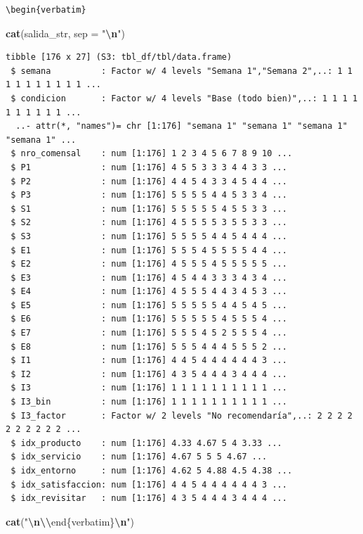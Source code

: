 \documentclass[
  spanish,
]{article}
\newenvironment{Shaded}{\begin{snugshade}}{\end{snugshade}}
\newcommand{\AttributeTok}[1]{\textcolor[rgb]{0.13,0.29,0.53}{#1}}
\newcommand{\FunctionTok}[1]{\textcolor[rgb]{0.13,0.29,0.53}{\textbf{#1}}}
\newcommand{\NormalTok}[1]{#1}
\newcommand{\SpecialCharTok}[1]{\textcolor[rgb]{0.81,0.36,0.00}{\textbf{#1}}}
\newcommand{\StringTok}[1]{\textcolor[rgb]{0.31,0.60,0.02}{#1}}
\begin{document}
\begin{verbatim}
\begin{verbatim}
\end{verbatim}

\begin{Shaded}
\begin{Highlighting}[]
\FunctionTok{cat}\NormalTok{(salida\_str, }\AttributeTok{sep =} \StringTok{"}\SpecialCharTok{\textbackslash{}n}\StringTok{"}\NormalTok{)}
\end{Highlighting}
\end{Shaded}

\begin{verbatim}
tibble [176 x 27] (S3: tbl_df/tbl/data.frame)
 $ semana          : Factor w/ 4 levels "Semana 1","Semana 2",..: 1 1 1 1 1 1 1 1 1 1 ...
 $ condicion       : Factor w/ 4 levels "Base (todo bien)",..: 1 1 1 1 1 1 1 1 1 1 ...
  ..- attr(*, "names")= chr [1:176] "semana 1" "semana 1" "semana 1" "semana 1" ...
 $ nro_comensal    : num [1:176] 1 2 3 4 5 6 7 8 9 10 ...
 $ P1              : num [1:176] 4 5 5 3 3 3 4 4 3 3 ...
 $ P2              : num [1:176] 4 4 5 4 3 3 4 5 4 4 ...
 $ P3              : num [1:176] 5 5 5 5 4 4 5 3 3 4 ...
 $ S1              : num [1:176] 5 5 5 5 5 4 5 5 3 3 ...
 $ S2              : num [1:176] 4 5 5 5 5 3 5 5 3 3 ...
 $ S3              : num [1:176] 5 5 5 5 4 4 5 4 4 4 ...
 $ E1              : num [1:176] 5 5 5 4 5 5 5 5 4 4 ...
 $ E2              : num [1:176] 4 5 5 5 4 5 5 5 5 5 ...
 $ E3              : num [1:176] 4 5 4 4 3 3 3 4 3 4 ...
 $ E4              : num [1:176] 4 5 5 5 4 4 3 4 5 3 ...
 $ E5              : num [1:176] 5 5 5 5 5 4 4 5 4 5 ...
 $ E6              : num [1:176] 5 5 5 5 5 4 5 5 5 4 ...
 $ E7              : num [1:176] 5 5 5 4 5 2 5 5 5 4 ...
 $ E8              : num [1:176] 5 5 5 4 4 4 5 5 5 2 ...
 $ I1              : num [1:176] 4 4 5 4 4 4 4 4 4 3 ...
 $ I2              : num [1:176] 4 3 5 4 4 4 3 4 4 4 ...
 $ I3              : num [1:176] 1 1 1 1 1 1 1 1 1 1 ...
 $ I3_bin          : num [1:176] 1 1 1 1 1 1 1 1 1 1 ...
 $ I3_factor       : Factor w/ 2 levels "No recomendaría",..: 2 2 2 2 2 2 2 2 2 2 ...
 $ idx_producto    : num [1:176] 4.33 4.67 5 4 3.33 ...
 $ idx_servicio    : num [1:176] 4.67 5 5 5 4.67 ...
 $ idx_entorno     : num [1:176] 4.62 5 4.88 4.5 4.38 ...
 $ idx_satisfaccion: num [1:176] 4 4 5 4 4 4 4 4 4 3 ...
 $ idx_revisitar   : num [1:176] 4 3 5 4 4 4 3 4 4 4 ...
\end{verbatim}

\begin{Shaded}
\begin{Highlighting}[]
\FunctionTok{cat}\NormalTok{(}\StringTok{"}\SpecialCharTok{\textbackslash{}n\textbackslash{}\textbackslash{}}\StringTok{end\{verbatim\}}\SpecialCharTok{\textbackslash{}n}\StringTok{"}\NormalTok{)}
\end{Highlighting}
\end{Shaded}
\end{document}
